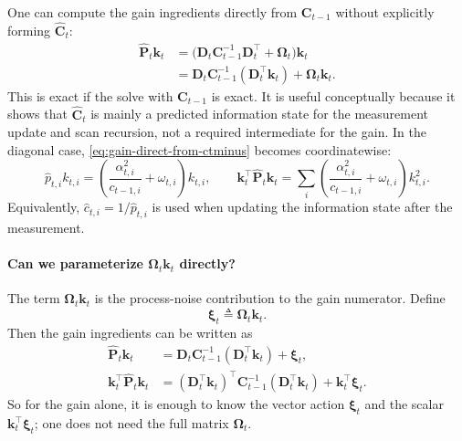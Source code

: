 \documentclass[11pt]{article}
\newcommand{\ve}[1]{\boldsymbol{#1}}
\newcommand{\tr}{\intercal}
\begin{document}
One can compute the gain ingredients directly from $\ve{C}_{t-1}$ without explicitly forming
$\widehat{\ve{C}}_t$:
\begin{equation}
\begin{aligned}
  \widehat{\ve{P}}_t\ve{k}_t
  &=
  \big(\ve{D}_t\ve{C}_{t-1}^{-1}\ve{D}_t^{\tr}+\ve{\Omega}_t\big)\ve{k}_t \\
  &=
  \ve{D}_t\ve{C}_{t-1}^{-1}(\ve{D}_t^{\tr}\ve{k}_t)
  +\ve{\Omega}_t\ve{k}_t.
\end{aligned}
  \label{eq:gain-direct-from-ctminus}
\end{equation}
This is exact if the solve with $\ve{C}_{t-1}$ is exact. It is useful conceptually because it
shows that $\widehat{\ve{C}}_t$ is mainly a predicted information state for the measurement
update and scan recursion, not a required intermediate for the gain. In the diagonal case,
\eqref{eq:gain-direct-from-ctminus} becomes coordinatewise:
\begin{equation}
  \widehat{p}_{t,i}k_{t,i}
  =
  \left(\frac{\alpha_{t,i}^2}{c_{t-1,i}}+\omega_{t,i}\right)k_{t,i},
  \qquad
  \ve{k}_t^{\tr}\widehat{\ve{P}}_t\ve{k}_t
  =
  \sum_i
  \left(\frac{\alpha_{t,i}^2}{c_{t-1,i}}+\omega_{t,i}\right)k_{t,i}^2.
  \label{eq:diag-gain-direct-from-cprev}
\end{equation}
Equivalently, $\widehat{c}_{t,i}=1/\widehat{p}_{t,i}$ is used when updating the information
state after the measurement.

\paragraph{Can we parameterize $\ve{\Omega}_t\ve{k}_t$ directly?}
The term $\ve{\Omega}_t\ve{k}_t$ is the process-noise contribution to the gain numerator.
Define
\[
  \ve{\xi}_t\triangleq \ve{\Omega}_t\ve{k}_t .
\]
Then the gain ingredients can be written as
\begin{equation}
\begin{aligned}
  \widehat{\ve{P}}_t\ve{k}_t
  &=
  \ve{D}_t\ve{C}_{t-1}^{-1}(\ve{D}_t^{\tr}\ve{k}_t)
  +\ve{\xi}_t,\\
  \ve{k}_t^{\tr}\widehat{\ve{P}}_t\ve{k}_t
  &=
  (\ve{D}_t^{\tr}\ve{k}_t)^{\tr}\ve{C}_{t-1}^{-1}
  (\ve{D}_t^{\tr}\ve{k}_t)
  +\ve{k}_t^{\tr}\ve{\xi}_t .
\end{aligned}
  \label{eq:gain-direct-xi}
\end{equation}
So for the gain alone, it is enough to know the vector action $\ve{\xi}_t$ and the scalar
$\ve{k}_t^{\tr}\ve{\xi}_t$; one does not need the full matrix $\ve{\Omega}_t$.
\end{document}
